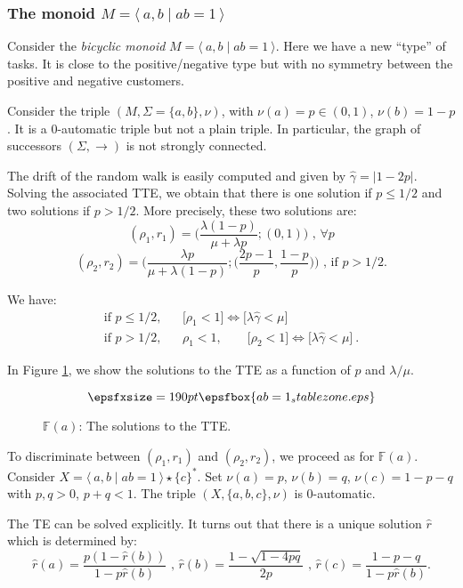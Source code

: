\documentclass[11pt,a4paper]{article}
\theoremstyle{remark}
\def\Blackboardfont{\mathbb}
\newcommand{\pres}[2]{\langle \: #1 \mid #2 \: \rangle}
\def\F{{\Blackboardfont F}}
\def\iff{\Longleftrightarrow}
\begin{document}
\subsubsection{The monoid $M= \pres{a,b}{ab=1}$}

Consider the {\em bicyclic monoid} $M= \pres{a,b}{ab=1}$. Here we have
a new ``type'' 
of tasks. It is close to the positive/negative type but with no
symmetry between the positive and negative customers. 

Consider the triple $(M,\Sigma=\{a,b\},\nu)$, with
$\nu(a)=p \in (0,1)$, $\nu(b)=1-p$. It is a 0-automatic triple but not a plain
triple. In particular, the graph of successors $(\Sigma,\rightarrow)$
is not strongly connected. 

The drift of the random walk is easily
computed and given by $\widehat{\gamma}=|1-2p|$.
Solving the associated TTE, we obtain that there is one solution
if $p\leq 1/2$ and two solutions if $p> 1/2$. More precisely,
these two solutions are:
$$(\rho_1,r_1)=\bigg(\frac{\lambda(1-p)}{\mu+\lambda p};(0,1)\bigg) \mbox{ , }\forall p $$
$$ (\rho_2,r_2)=\bigg(\frac{\lambda p}{\mu+\lambda
  (1-p)};\big(\frac{2p-1}{p},
\frac{1-p}{p}\big)\bigg) \mbox{ , if } p > 1/2. $$

We have:
\begin{eqnarray*}
\text{if } p\leq  1/2, & & \bigl[ \rho_1 <1 \bigr] \iff \bigl[ \lambda
    \widehat{\gamma} < \mu \bigl] \\
\text{if } p> 1/2, &  & \rho_1 <1, \qquad  \bigl[ \rho_2 <1 \bigr] \iff \bigl[ \lambda
  \widehat{\gamma} < \mu \bigl] \:.
\end{eqnarray*}

In Figure \ref{fi-stable_c}, we show the solutions to the TTE as a function of
$p$ and $\lambda/\mu$.

\begin{figure}[ht]
\[ \epsfxsize=190pt \epsfbox{ab=1_stablezone.eps} \]
\caption{$\F(a)$: The solutions to the TTE.}
\label{fi-stable_c}
\end{figure}


To discriminate between $(\rho_1,r_1)$ and $(\rho_2,r_2)$, we proceed
as for $\F(a)$.
Consider $X=\pres{a,b}{ab=1} \star  \{c\}^*$. Set $\nu(a)=p$,
$\nu(b)=q$, $\nu(c)=1-p-q$ with $p,q>0$, $p+q<1$.  The triple
$(X,\{a,b,c\},\nu)$ is 0-automatic. 

The TE can be solved explicitly. It turns out that there is a unique
solution $\widehat{r}$ which
is determined by:
$$\widehat{r}(a)=\frac{p(1-\widehat{r}(b))}{1-p \widehat{r}(b)} \mbox{ , }
\widehat{r}(b)=\frac{1-\sqrt{1-4pq}}{2p} \mbox{ , }
\widehat{r}(c)=\frac{1-p-q}{1-p \widehat{r}(b)}. $$
\end{document}
